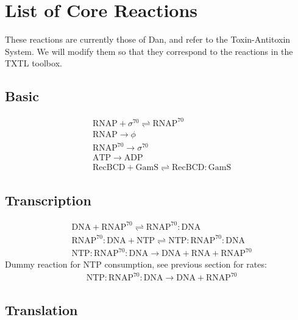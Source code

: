 	\section{List of Core Reactions}
	These reactions are currently those of Dan, and refer to the Toxin-Antitoxin System. We will modify them so that they correspond to the reactions in the TXTL toolbox. 
	
	
	\subsection{Basic}

\begin{align}
& \mathrm{RNAP} + \sigma^{70} \rightleftharpoons \mathrm{RNAP^{70}} \\
& \mathrm{RNAP} \rightarrow \phi \\
& \mathrm{RNAP^{70}} \rightarrow \sigma^{70} \\
& \mathrm{ATP} \rightarrow \mathrm{ADP} \\
& \mathrm{RecBCD} + \mathrm{GamS} \rightleftharpoons \mathrm{RecBCD}\!:\!\mathrm{GamS} 
\end{align}
	
	\subsection{Transcription}

\begin{align}
& \mathrm{DNA} + \mathrm{RNAP^{70}} \rightleftharpoons \mathrm{RNAP^{70}}\!:\!\mathrm{DNA} \\
& \mathrm{RNAP^{70}}\!:\!\mathrm{DNA} + \mathrm{NTP} \rightleftharpoons \mathrm{NTP}\!:\!\mathrm{RNAP^{70}}\!:\!\mathrm{DNA} \\
& \mathrm{NTP}\!:\!\mathrm{RNAP^{70}}\!:\!\mathrm{DNA} \rightarrow \mathrm{DNA} +  \mathrm{RNA} + \mathrm{RNAP^{70}} 
\end{align}
Dummy reaction for NTP consumption, see previous section for rates:\\
\begin{align}
& \mathrm{NTP}\!:\!\mathrm{RNAP^{70}}\!:\!\mathrm{DNA} \rightarrow \mathrm{DNA} + \mathrm{RNAP^{70}} 
\end{align}

\subsection{Translation}

